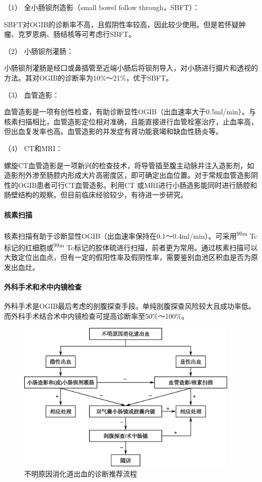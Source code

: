\hypertarget{text00034.htmlux5cux23CHP1-13-3-1-1-3-1}{}
（1） 全小肠钡剂造影（small bowel follow through，SBFT）：

SBFT对OGIB的诊断率不高，且假阴性率较高，因此较少使用。但是若怀疑肿瘤、克罗恩病、肠结核等可考虑行SBFT。

\hypertarget{text00034.htmlux5cux23CHP1-13-3-1-1-3-2}{}
（2） 小肠钡剂灌肠：

小肠钡剂灌肠是经口或鼻插管至近端小肠后将钡剂导入，对小肠进行摄片和透视的方法。其对OGIB的诊断率为10\%～21\%，优于SBFT。

\hypertarget{text00034.htmlux5cux23CHP1-13-3-1-1-3-3}{}
（3） 血管造影：

血管造影是一项有创性检查，有助诊断显性OGIB（出血速率大于0.5ml/min）。与核素扫描相比，血管造影定位相对准确，且能直接进行血管栓塞治疗，止血率高，但出血复发率也高。血管造影的并发症有肾功能衰竭和缺血性肠炎等。

\hypertarget{text00034.htmlux5cux23CHP1-13-3-1-1-3-4}{}
（4） CT和MRI：

螺旋CT血管造影是一项新兴的检查技术，将导管插至腹主动脉并注入造影剂，如造影剂外渗至肠腔内形成大片高密度区，即可确定出血位置。对于常规血管造影阴性的OGIB患者可行CT血管造影。利用CT
或MRI进行小肠造影能同时进行肠腔和肠壁结构的观察。但目前临床经验较少，有待进一步研究。

\paragraph{核素扫描}

核素扫描有助于诊断显性OGIB（出血速率保持在0.1～0.4ml/min）。可采用\textsuperscript{99m}
Tc标记的红细胞或\textsuperscript{99m}
Tc标记的胶体硫进行扫描，前者更为常用。通过核素扫描可以大致定位出血点，但有一定的假阳性率及假阴性率，需要鉴别血池区积血是否为原发出血灶。

\paragraph{外科手术和术中内镜检查}

外科手术是OGIB最后考虑的剖腹探查手段。单纯剖腹探查风险较大且成功率低。而外科手术结合术中内镜检查可提高诊断率至50\%～100\%。

\begin{figure}[!htbp]
 \centering
 \includegraphics[width=4.19792in,height=2.86458in]{./images/Image00060.jpg}
 \captionsetup{justification=centering}
 \caption{不明原因消化道出血的诊断推荐流程}
 \label{fig13-3}
  \end{figure} 

